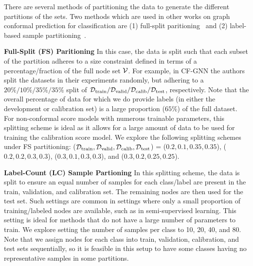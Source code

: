 There are several methods of partitioning the data to generate the different partitions of the sets. 
Two methods which are used in other works on graph conformal prediction for classification are (1) full-split paritioning~\cite{huang2024uncertainty} and (2) label-based sample partitioning~\cite{zargarbashi23conformal}.
 
\noindent \textbf{Full-Split (FS) Paritioning}
In this case, the data is split such that each subset of the partition adheres to a size constraint defined in terms of a percentage/fraction of the full node set ${\mathcal{V}}$.
For example, in CF-GNN \cite{huang2024uncertainty} the authors split the datasets in their experiments randomly, but adhering to a $20\%/10\%/35\%/35\%$ split of $\mathcal{D_{\mathrm{train}}}/\mathcal{D_{\mathrm{valid}}}/\mathcal{D_{\mathrm{calib}}}/\mathcal{D_{\mathrm{test}}}$, respectively.
Note that the overall percentage of data for which we do provide labels (in either the development or calibration set) is a large proportion ($65\%$) of the full dataset.
For non-conformal score models with numerous trainable parameters, this splitting scheme is ideal as it allows for a large amount of data to be used for training the calibration score  model.
We explore the following splitting schemes under FS partitioning:
($\mathcal{D_{\mathrm{train}}},\mathcal{D_{\mathrm{valid}}},\mathcal{D_{\mathrm{calib}}},\mathcal{D_{\mathrm{test}}}$) = ($0.2, 0.1,0.35, 0.35$), ($0.2,0.2,0.3,0.3$), ($0.3,0.1,0.3,0.3$), and ($0.3,0.2,0.25,0.25$).

\noindent \textbf{Label-Count (LC) Sample Partioning}
In this splitting scheme, the data is split to ensure an equal number of samples for each class/label are present in the train, validation, and calibration set.
The remaining nodes are then used for the test set.
Such settings are common in  settings where only a small proportion of training/labeled nodes are available, such as in semi-supervised learning.
This setting is ideal for methods that do not have a large number of parameters to train.
We explore setting the number of samples per class to 10, 20, 40, and 80.
Note that we assign nodes for each class into train, validation, calibration, and test sets sequentially, so it is feasible in this setup to have some classes having no representative samples in some partitions. 
